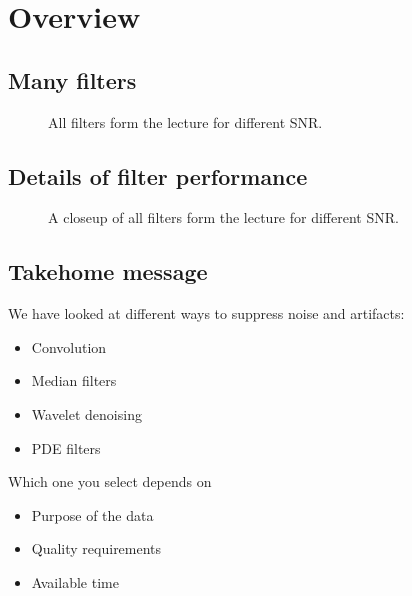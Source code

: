 \documentclass[letterpaper,10pt,english]{sphinxmanual}
\begin{document}
\sphinxAtStartPar
{}


\chapter{Overview}
\label{\detokenize{02-ImageEnhancement:overview}}

\section{Many filters}
\label{\detokenize{02-ImageEnhancement:many-filters}}
\begin{figure}[htbp]
\centering
\capstart

\noindent{}
\caption{All filters form the lecture for different SNR.}\label{\detokenize{02-ImageEnhancement:id34}}\end{figure}




\section{Details of filter performance}
\label{\detokenize{02-ImageEnhancement:details-of-filter-performance}}
\begin{figure}[htbp]
\centering
\capstart

\noindent{}
\caption{A close\sphinxhyphen{}up of all filters form the lecture for different SNR.}\label{\detokenize{02-ImageEnhancement:id35}}\end{figure}




\section{Take\sphinxhyphen{}home message}
\label{\detokenize{02-ImageEnhancement:take-home-message}}
\sphinxAtStartPar
We have looked at different ways to suppress noise and artifacts:
\begin{itemize}
\item {} 
\sphinxAtStartPar
Convolution

\item {} 
\sphinxAtStartPar
Median filters

\item {} 
\sphinxAtStartPar
Wavelet denoising

\item {} 
\sphinxAtStartPar
PDE filters

\end{itemize}

\sphinxAtStartPar
Which one you select depends on
\begin{itemize}
\item {} 
\sphinxAtStartPar
Purpose of the data

\item {} 
\sphinxAtStartPar
Quality requirements

\item {} 
\sphinxAtStartPar
Available time

\end{itemize}









\renewcommand{\indexname}{Index}
\printindex
\end{document}
